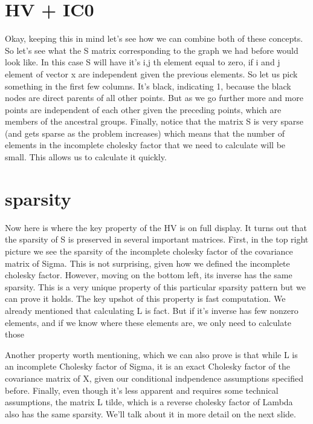 \documentclass[12pt]{article} %
\begin{document}
\section*{HV + IC0}
Okay, keeping this in mind let's see how we can combine both of these concepts. So let's see what the S matrix corresponding to the graph we had before would look like. In this case S will have it's i,j th element equal to zero, if i and j element of vector x are independent given the previous elements. So let us pick something in the first few columns. It's black, indicating 1, because the black nodes are direct parents of all other points. But as we go further more and more points are independent of each other given the preceding points, which are members of the ancestral groups. Finally, notice that the matrix S is very sparse (and gets sparse as the problem increases) which means that the number of elements in the incomplete cholesky factor that we need to calculate will be small. This allows us to calculate it quickly.




\newpage
\section*{sparsity}


Now here is where the key property of the HV is on full display. It turns out that the sparsity of S is preserved in several important matrices. First, in the top right picture we see the sparsity of the incomplete cholesky factor of the covariance matrix of Sigma. This is not surprising, given how we defined the incomplete cholesky factor. However, moving on the bottom left, its inverse has the same sparsity. This is a very unique property of this particular sparsity pattern but we can prove it holds. The key upshot of this property is fast computation. We already mentioned that calculating L is fact. But if it's inverse has few nonzero elements, and if we know where these elements are, we only need to calculate those

Another property worth mentioning, which we can also prove is that while L is an incomplete Cholesky factor of Sigma, it is an exact Cholesky factor of the covariance matrix of X, given our conditional indpendence assumptions specified before. Finally, even though it's less apparent and requires some technical assumptions, the matrix L tilde, which is a reverse cholesky factor of Lambda also has the same sparsity. We'll talk about it in more detail on the next slide.
\end{document}
